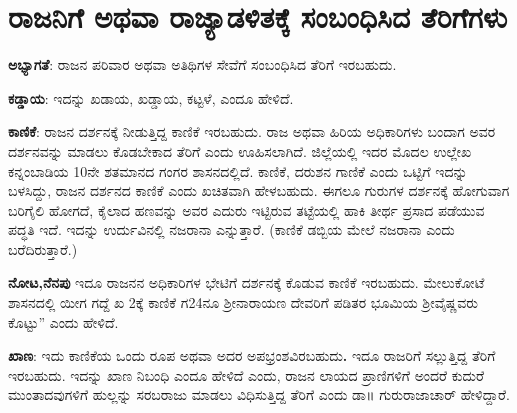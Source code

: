 \section{ರಾಜನಿಗೆ ಅಥವಾ ರಾಜ್ಯಾಡಳಿತಕ್ಕೆ ಸಂಬಂಧಿಸಿದ ತೆರಿಗೆಗಳು}

\textbf{ಅಭ್ಯಾಗತೆ}: ರಾಜನ ಪರಿವಾರ ಅಥವಾ ಅತಿಥಿಗಳ ಸೇವೆಗೆ ಸಂಬಂಧಿಸಿದ ತೆರಿಗೆ ಇರಬಹುದು.

\textbf{ಕಡ್ಡಾಯ}: ಇದನ್ನು ಖಡಾಯ, ಖಡ್ಡಾಯ, ಕಟ್ಟಳೆ, ಎಂದೂ ಹೇಳಿದೆ.

\textbf{ಕಾಣಿಕೆ}: ರಾಜನ ದರ್ಶನಕ್ಕೆ ನೀಡುತ್ತಿದ್ದ ಕಾಣಿಕೆ ಇರಬಹುದು. ರಾಜ ಅಥವಾ ಹಿರಿಯ ಅಧಿಕಾರಿಗಳು ಬಂದಾಗ ಅವರ ದರ್ಶನವನ್ನು ಮಾಡಲು ಕೊಡಬೇಕಾದ ತೆರಿಗೆ ಎಂದು ಊಹಿಸಲಾಗಿದೆ. ಜಿಲ್ಲೆಯಲ್ಲಿ ಇದರ ಮೊದಲ ಉಲ್ಲೇಖ ಕನ್ನಂಬಾಡಿಯ 10ನೇ ಶತಮಾನದ ಗಂಗರ ಶಾಸನದಲ್ಲಿದೆ. ಕಾಣಿಕೆ, ದರುಶನ ಗಾಣಿಕೆ ಎಂದು ಒಟ್ಟಿಗೆ ಇದನ್ನು ಬಳಸಿದ್ದು, ರಾಜನ ದರ್ಶನದ ಕಾಣಿಕೆ ಎಂದು ಖಚಿತವಾಗಿ ಹೇಳಬಹುದು. ಈಗಲೂ ಗುರುಗಳ ದರ್ಶನಕ್ಕೆ ಹೋಗುವಾಗ ಬರಿಗೈಲಿ ಹೋಗದೆ, ಕೈಲಾದ ಹಣವನ್ನು ಅವರ ಎದುರು ಇಟ್ಟಿರುವ ತಟ್ಟೆಯಲ್ಲಿ ಹಾಕಿ ತೀರ್ಥ ಪ್ರಸಾದ ಪಡೆಯುವ ಪದ್ಧತಿ ಇದೆ. ಇದನ್ನು ಉರ್ದುವಿನಲ್ಲಿ ನಜರಾನಾ ಎನ್ನುತ್ತಾರೆ. (ಕಾಣಿಕೆ ಡಬ್ಬಿಯ ಮೇಲೆ ನಜರಾನಾ ಎಂದು ಬರೆದಿರುತ್ತಾರೆ.)

\textbf{ನೋಟ,ನೆನಪು} ಇದೂ ರಾಜನನ ಅಧಿಕಾರಿಗಳ ಭೇಟಿಗೆ ದರ್ಶನಕ್ಕೆ ಕೊಡುವ ಕಾಣಿಕೆ ಇರಬಹುದು. ಮೇಲುಕೋಟೆ ಶಾಸನದಲ್ಲಿ ಯೀಗ ಗದ್ದೆ ಖ 2ಕ್ಕೆ ಕಾಣಿಕೆ ಗ24ನೂ ಶ‍್ರೀನಾರಾಯಣ ದೇವರಿಗೆ ಪಡಿತರ ಭೂಮಿಯ ಶ‍್ರೀವೈಷ್ಣವರು ಕೊಟ್ಟು” ಎಂದು ಹೇಳಿದೆ.

\textbf{ಖಾಣ}: ಇದು ಕಾಣಿಕೆಯ ಒಂದು ರೂಪ ಅಥವಾ ಅದರ ಅಪಭ್ರಂಶವಿರಬಹುದು\textbf{. }ಇದೂ ರಾಜರಿಗೆ ಸಲ್ಲುತ್ತಿದ್ದ ತೆರಿಗೆ ಇರಬಹುದು. ಇದನ್ನು ಖಾಣ ನಿಬಂಧಿ ಎಂದೂ ಹೇಳಿದೆ ಎಂದು, ರಾಜನ ಲಾಯದ ಪ್ರಾಣಿಗಳಿಗೆ ಅಂದರೆ ಕುದುರೆ ಮುಂತಾದವುಗಳಿಗೆ ಹುಲ್ಲನ್ನು ಸರಬರಾಜು ಮಾಡಲು ವಿಧಿಸುತ್ತಿದ್ದ ತೆರಿಗೆ ಎಂದು ಡಾ॥ ಗುರುರಾಜಾಚಾರ್​ ಹೇಳಿದ್ದಾರೆ.

